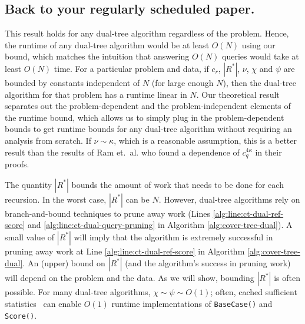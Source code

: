 \subsection{Back to your regularly scheduled paper.}

This result holds for any dual-tree algorithm regardless of the problem. Hence,
the runtime of any dual-tree algorithm
would be at least $O(N)$ using our bound, which matches the intuition that
answering $O(N)$ queries would take at least $O(N)$ time. For a particular
problem and data, if $c_r$, $|R^*|$, $\nu$, $\chi$ and
$\psi$ are bounded by constants independent of $N$ (for large enough $N$), then
the dual-tree algorithm for that problem has a runtime linear in $N$. Our
theoretical result separates out the problem-dependent and the
problem-independent elements of the runtime bound, which allows us to simply
plug in the problem-dependent bounds to get runtime bounds for any dual-tree
algorithm without requiring an analysis from scratch.
If $\nu \sim \kappa$, which is a reasonable assumption, this is a better result
than the results of Ram et.~al.  \cite{ram2009} who found a dependence of
$c_q^{4 \kappa}$ in their proofs.

The quantity $|R^*|$ bounds the amount of work that needs to be done for each
recursion. In the worst case, $|R^*|$ can be $N$. However,
dual-tree algorithms rely on branch-and-bound techniques to prune away
work (Lines \ref{alg:line:ct-dual-ref-score} and
\ref{alg:line:ct-dual-query-pruning} in Algorithm \ref{alg:cover-tree-dual}). A
small value of $|R^*|$ will imply that the algorithm is extremely successful in
pruning away work at Line \ref{alg:line:ct-dual-ref-score} in Algorithm
\ref{alg:cover-tree-dual}. An (upper) bound on $|R^*|$ (and the algorithm's
success in pruning work) will depend on the problem and the data.  As we will
show, bounding $|R^*|$ is often possible. %
For many dual-tree algorithms, $\chi \sim \psi \sim O(1)$; often, cached
sufficient statistics~\cite{moore2000anchors} can enable $O(1)$ runtime
implementations of \texttt{BaseCase()} and \texttt{Score()}.

